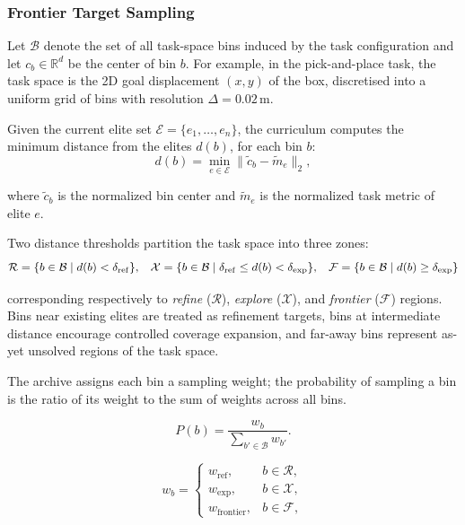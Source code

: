\documentclass{article}
\begin{document}
\subsubsection{Frontier Target Sampling}
\label{sec:frontier}

Let \(\mathcal{B}\) denote the set of all task-space bins induced by the
task configuration and let \(c_b \in \mathbb{R}^{d}\) be the center of
bin \(b\). For example, in the pick-and-place task, the task space is the 2D goal displacement $(x, y)$ of the box, discretised into a uniform
grid of bins with resolution $\Delta = 0.02$\,m.

Given the current elite set
\(\mathcal{E} = \{e_1, \dots, e_n\}\), the curriculum computes the minimum distance from the elites $d(b)$, for each bin $b$:
\[
    d(b) = \min_{e \in \mathcal{E}} \lVert \tilde{c}_b - \tilde{m}_e \rVert_2 ,
\]

where \(\tilde{c}_b\) is the normalized bin center and
\(\tilde{m}_e\) is the normalized task metric of elite \(e\).

Two distance thresholds partition the task space into three zones:
\[
    \mathcal{R} = \{ b \in \mathcal{B} \mid d(b) < \delta_{\mathrm{ref}} \},
    \hspace{3mm}
    \mathcal{X} = \{ b \in \mathcal{B} \mid \delta_{\mathrm{ref}} \le d(b) < \delta_{\mathrm{exp}} \},
    \hspace{3mm}
    \mathcal{F} = \{ b \in \mathcal{B} \mid d(b) \ge \delta_{\mathrm{exp}} \}
\]

corresponding respectively to \emph{refine} ($\mathcal{R}$), \emph{explore} ($\mathcal{X}$), and
\emph{frontier} ($\mathcal{F}$) regions. Bins near existing elites are treated as
refinement targets, bins at intermediate distance encourage controlled
coverage expansion, and far-away bins represent as-yet unsolved regions
of the task space.

The archive assigns each bin a sampling weight; the probability of sampling a bin is the ratio of its weight to the sum of weights across all bins.

\begin{minipage}[c]{0.48\linewidth}
    \[
        P(b) = \frac{w_b}{\sum_{b' \in \mathcal{B}} w_{b'}}.
    \]
\end{minipage}
\hspace{-2cm} 
\begin{minipage}[c]{0.48\linewidth}
    \[
        w_b =
        \begin{cases}
            w_{\mathrm{ref}},      & b \in \mathcal{R}, \\
            w_{\mathrm{exp}},      & b \in \mathcal{X}, \\
            w_{\mathrm{frontier}}, & b \in \mathcal{F},
        \end{cases}
    \]
\end{minipage}
\end{document}
